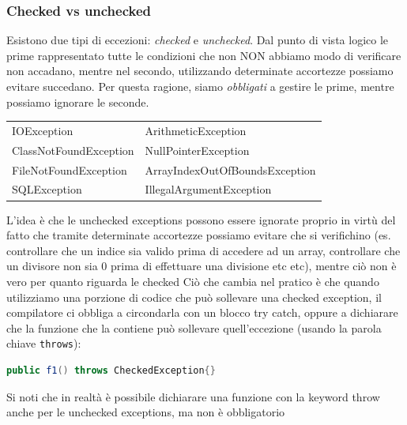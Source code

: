 \subsubsection{Checked vs unchecked}
Esistono due tipi di eccezioni: \textit{checked} e \textit{unchecked}. Dal punto di vista logico le prime rappresentato tutte le condizioni che non NON abbiamo modo di verificare non accadano, mentre nel secondo, utilizzando determinate accortezze possiamo evitare succedano. Per questa ragione, siamo \textit{obbligati} a gestire le prime, mentre possiamo ignorare le seconde.
\begin{center}
	\begin{tabular}{l l}
		\toprule
		\sfblue{Checked exceptions} & \sfblue{Unchecked exceptions}  \\
		\midrule
		IOException                 & ArithmeticException            \\
		ClassNotFoundException      & NullPointerException           \\
		FileNotFoundException       & ArrayIndexOutOfBoundsException \\
		SQLException                & IllegalArgumentException       \\
		\bottomrule
	\end{tabular}
\end{center}
L'idea è che le unchecked exceptions possono essere ignorate proprio in virtù del fatto che tramite determinate accortezze possiamo evitare che si verifichino (es. controllare che un indice sia valido prima di accedere ad un array, controllare che un divisore non sia 0 prima di effettuare una divisione etc etc), mentre ciò non è vero per quanto riguarda le checked
\vskip3mm
Ciò che cambia nel pratico è che quando utilizziamo una porzione di codice che può sollevare una checked exception, il compilatore ci obbliga a circondarla con un blocco try catch, oppure a dichiarare che la funzione che la contiene può sollevare quell'eccezione (usando la parola chiave \verb|throws|):
\begin{lstlisting}[language = java, frame = none]
public f1() throws CheckedException{}
\end{lstlisting}
Si noti che in realtà è possibile dichiarare una funzione con la keyword throw anche per le unchecked exceptions, ma non è obbligatorio


